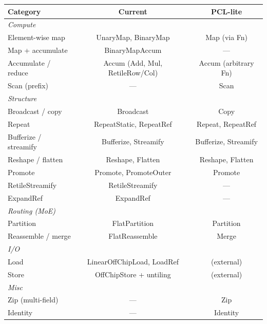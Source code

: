 \documentclass[11pt]{article}
\begin{document}
\begin{center}
\small
\begin{tabular}{lcc}
\toprule
\textbf{Category} & \textbf{Current} & \textbf{PCL-lite} \\
\midrule
\multicolumn{3}{l}{\emph{Compute}} \\
\quad Element-wise map      & UnaryMap, BinaryMap      & Map (via Fn) \\
\quad Map + accumulate      & BinaryMapAccum           & --- \\
\quad Accumulate / reduce   & Accum (Add, Mul, RetileRow/Col) & Accum (arbitrary Fn) \\
\quad Scan (prefix)         & ---                      & Scan \\
\midrule
\multicolumn{3}{l}{\emph{Structure}} \\
\quad Broadcast / copy      & Broadcast                & Copy \\
\quad Repeat                & RepeatStatic, RepeatRef  & Repeat, RepeatRef \\
\quad Bufferize / streamify & Bufferize, Streamify     & Bufferize, Streamify \\
\quad Reshape / flatten     & Reshape, Flatten         & Reshape, Flatten \\
\quad Promote               & Promote, PromoteOuter    & Promote \\
\quad RetileStreamify       & RetileStreamify          & --- \\
\quad ExpandRef             & ExpandRef                & --- \\
\midrule
\multicolumn{3}{l}{\emph{Routing (MoE)}} \\
\quad Partition             & FlatPartition            & Partition \\
\quad Reassemble / merge    & FlatReassemble           & Merge \\
\midrule
\multicolumn{3}{l}{\emph{I/O}} \\
\quad Load                  & LinearOffChipLoad, LoadRef & (external) \\
\quad Store                 & OffChipStore + untiling  & (external) \\
\midrule
\multicolumn{3}{l}{\emph{Misc}} \\
\quad Zip (multi-field)     & ---                      & Zip \\
\quad Identity              & ---                      & Identity \\
\bottomrule
\end{tabular}
\end{center}
\end{document}
